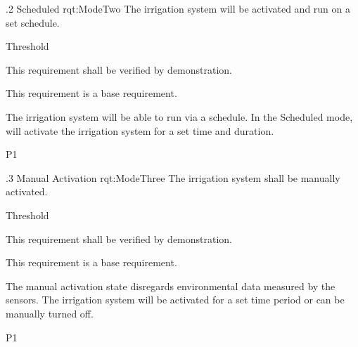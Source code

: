 \ONERQMTV
{\RqtNumberBase.2}
{Scheduled}
{rqt:ModeTwo}
{The \ThisSystem irrigation system will be activated and run on a set schedule.}
{
	\item [All Phases] Threshold
}
{This requirement shall be verified by demonstration.}
{
	\item [N/A] This requirement is a base requirement.
}
{
	\item The irrigation system will be able to run via a schedule. In the Scheduled mode, \ThisSys will activate the irrigation system for a set time and duration.
}
{P1}


\ONERQMTV
{\RqtNumberBase.3}
{Manual Activation}
{rqt:ModeThree}
{The \ThisSystem irrigation system shall be manually activated.}
{
	\item [All Phases] Threshold
}
{This requirement shall be verified by demonstration.}
{
	\item [N/A] This requirement is a base requirement.
}
{
	\item The manual activation state disregards environmental data measured by the \ThisSys sensors. The irrigation system will be activated for a set time period or can be manually turned off.
}
{P1}
